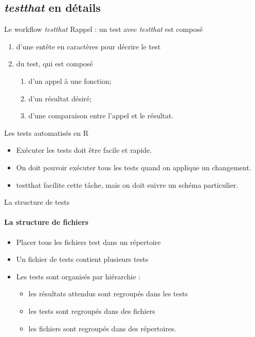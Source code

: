 \documentclass[11pt]{beamer}
\begin{document}
\subsection[\emph{testthat} en détails]{\emph{testthat} en détails}

\begin{frame}{Le workflow \textit{testthat}}
Rappel : un test avec \textit{testthat} est composé

\begin{enumerate}
\item d'une entête en caractères pour décrire le test
\item du test, qui est composé
\begin{enumerate}
\item d'un appel à une fonction;
\item d'un résultat désiré;
\item d'une comparaison entre l'appel et le résultat. 
\end{enumerate}
\end{enumerate}
\end{frame}

\begin{frame}{Les tests automatisés en R}
\begin{itemize}
\item Exécuter les tests doit être facile et rapide.
\item On doit pouvoir exécuter tous les tests quand on applique un changement.
\item testthat facilite cette tâche, mais on doit suivre un schéma particulier.
\end{itemize}
\end{frame}

\begin{frame}{La structure de tests}
\framesubtitle{La structure de fichiers}
\begin{itemize}
\item Placer tous les fichiers test dans un répertoire
\item Un fichier de tests contient plusieurs tests
\item Les tests sont organisés par hiérarchie : 
\begin{itemize}
    \item les résultats attendus sont regroupés dans les tests
    \item les tests sont regroupés dans des fichiers
    \item les fichiers sont regroupés dans des répertoires. 
\end{itemize}
\end{itemize}
\end{frame}
\end{document}
